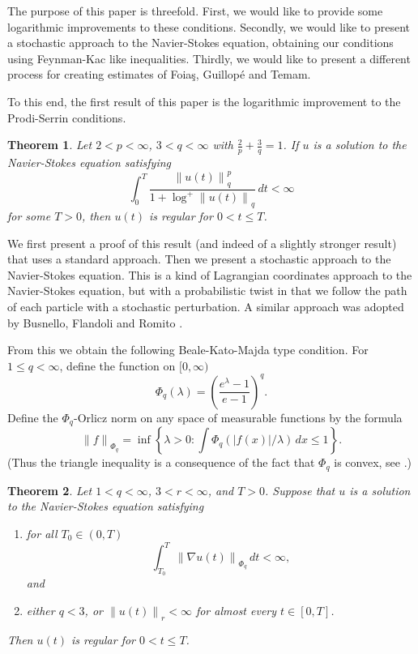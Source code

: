\documentclass[12pt]{amsart}
\newtheorem{thm}{Theorem}[section]
\theoremstyle{remark}
\newcommand{\smodo}[1]{{\mathopen|#1\mathclose|}}
\newcommand{\snormo}[1]{{\mathopen\|#1\mathclose\|}}
\begin{document}
The purpose of this paper is threefold.  First, we would like to provide some
logarithmic improvements to these conditions.  Secondly, we would like to
present a stochastic approach to the Navier-Stokes equation, obtaining
our conditions using Feynman-Kac like inequalities.  Thirdly, we would like
to present a different process for creating 
estimates of
Foia\c s, Guillop\'e and Temam.

To this end, the first result of this paper is the logarithmic improvement
to the Prodi-Serrin conditions.

\begin{thm} \label{main prodi-serrin}
Let 
$2 < p < \infty$, $3<q < \infty$ with
$\frac2p+\frac3q=1$.
If $u$ is a solution to the Navier-Stokes equation satisfying
$$ \int_0^T \frac{\snormo{u(t)}_q^p}{1+\log^+\snormo{u(t)}_q}
   \, dt < \infty $$
for some $T>0$, 
then $u(t)$ 
is regular for $0 < t\le T$.
\end{thm}

We first present a proof of this result (and indeed of
a slightly stronger result) that uses a standard approach.  
Then 
we present a stochastic approach to the Navier-Stokes equation.
This is a kind of Lagrangian coordinates approach to the
Navier-Stokes equation, but with a probabilistic twist in that we follow
the path of each particle with a stochastic perturbation.  A similar approach
was adopted by Busnello, Flandoli and Romito \cite{busnello et al}.

From this we obtain the following
Beale-Kato-Majda type condition.
For $ 1 \le q < \infty$, define the function on $[0,\infty)$
$$ \Phi_q(\lambda) = \left(\frac{e^\lambda-1}{e-1}\right)^q .$$
Define the
$\Phi_q$-Orlicz norm on
any space of measurable functions by the formula
$$ \snormo f_{\Phi_q} = 
   \inf\left\{\lambda>0:
   \int \Phi_q(\smodo{f(x)}/\lambda) \, dx \le 1 \right\} .$$
(Thus the triangle inequality is a consequence of the fact that
$\Phi_q$ is convex, see \cite{kras-rutickii}.)  

\begin{thm} \label{main beale-kato-majda}
Let 
$1<q < \infty$, $3<r<\infty$, and $T>0$.
Suppose that $u$ is a solution to the Navier-Stokes equation satisfying
\begin{enumerate}
\item for all $T_0\in(0,T)$
$$\displaystyle \int_{T_0}^T \snormo{\nabla u(t)}_{\Phi_q}
   \, dt < \infty ,$$ 
and
\item
either $q<3$, or $\snormo{u(t)}_r < \infty$ for almost every $t \in [0,T]$.
\end{enumerate}
Then $u(t)$ 
is regular for $0 < t\le T$.
\end{thm}
\end{document}

